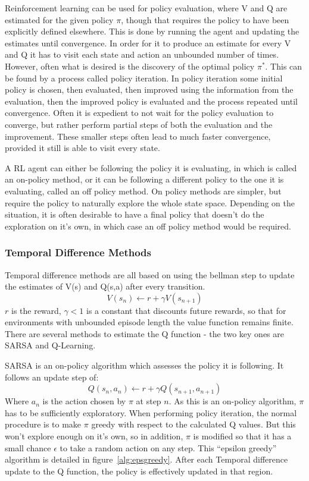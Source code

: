Reinforcement learning can be used for policy evaluation, where V and Q are estimated for the given policy $\pi$, though that requires the policy to have been explicitly defined elsewhere. This is done by running the agent and updating the estimates until convergence. In order for it to produce an estimate for every V and Q it has to visit each state and action an unbounded number of times. However, often what is desired is the discovery of the optimal policy $\pi^*$. This can be found by a process called policy iteration. In policy iteration some initial policy is chosen, then evaluated, then improved using the information from the evaluation, then the improved policy is evaluated and the process repeated until convergence. Often it is expedient to not wait for the policy evaluation to converge, but rather perform partial steps of both the evaluation and the improvement. These smaller steps often lead to much faster convergence, provided it still is able to visit every state.

A RL agent can either  be following the policy it is evaluating, in which is called an on-policy method, or it can be following a different policy to the one it is evaluating, called an off policy method. On policy methods are simpler, but require the policy to naturally explore the whole state space. Depending on the situation, it is often desirable to have a final policy that doesn't do the exploration on it's own, in which case an off policy method would be required.

\subsubsection{Temporal Difference Methods}
Temporal difference methods are all based on using the bellman step to update the estimates of V(s) and Q(s,a) after every transition.
\begin{equation}
V(s_n) \gets r + \gamma V(s_{n+1})
\end{equation}
$r$ is the reward, $\gamma < 1$ is a constant that discounts future rewards, so that for environments with unbounded episode length the value function remains finite. There are several methods to estimate the Q function - the two key ones are SARSA and Q-Learning.

SARSA is an on-policy algorithm which assesses the policy it is following. It follows an update step of:
\begin{equation}
Q(s_n,a_n) \gets r + \gamma Q(s_{n+1}, a_{n+1}) 
\end{equation}
Where $a_n$ is the action chosen by $\pi$ at step $n$. As this is an on-policy algorithm, $\pi$ has to be sufficiently exploratory. When performing policy iteration, the normal procedure is to make $\pi$ greedy with respect to the calculated Q values. But this won't explore enough on it's own, so in addition, $\pi$ is modified so that it has a small chance $\epsilon$ to take a random action on any step. This ``epsilon greedy'' algorithm is detailed in figure~\ref{alg:epsgreedy}. After each Temporal difference update to the Q function, the policy is effectively updated in that region.

